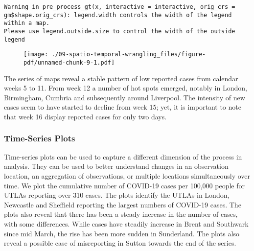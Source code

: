 \documentclass[
  letterpaper,
  krantz2]{style/krantz}
\begin{document}
\begin{verbatim}
Warning in pre_process_gt(x, interactive = interactive, orig_crs =
gm$shape.orig_crs): legend.width controls the width of the legend within a map.
Please use legend.outside.size to control the width of the outside legend
\end{verbatim}

\begin{figure}[H]

{\centering \texttt{[image: ./09-spatio-temporal-wrangling\_files/figure-pdf/unnamed-chunk-9-1.pdf]}

}

\end{figure}

The series of maps reveal a stable pattern of low reported cases from
calendar weeks 5 to 11. From week 12 a number of hot spots emerged,
notably in London, Birmingham, Cumbria and subsequently around
Liverpool. The intensity of new cases seem to have started to decline
from week 15; yet, it is important to note that week 16 display reported
cases for only two days.

\hypertarget{time-series-plots}{%
\subsubsection{Time-Series Plots}\label{time-series-plots}}

Time-series plots can be used to capture a different dimension of the
process in analysis. They can be used to better understand changes in an
observation location, an aggregation of observations, or multiple
locations simultaneously over time. We plot the cumulative number of
COVID-19 cases per 100,000 people for UTLAs reporting over 310 cases.
The plots identify the UTLAs in London, Newcastle and Sheffield
reporting the largest numbers of COVID-19 cases. The plots also reveal
that there has been a steady increase in the number of cases, with some
differences. While cases have steadily increase in Brent and Southwark
since mid March, the rise has been more sudden in Sunderland. The plots
also reveal a possible case of misreporting in Sutton towards the end of
the series.
\end{document}
